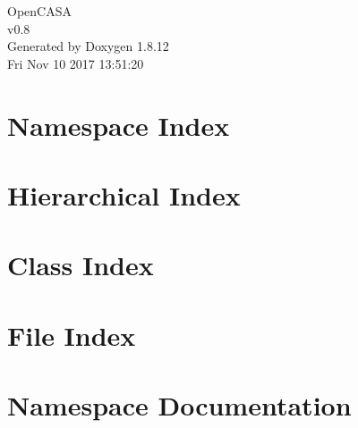 \documentclass[twoside]{book}
\newcommand{\+}{\discretionary{\mbox{\scriptsize$\hookleftarrow$}}{}{}}
\newcommand{\clearemptydoublepage}{%
  \newpage{\pagestyle{empty}\cleardoublepage}%
}
\begin{document}
\hypersetup{pageanchor=false,
             bookmarksnumbered=true,
             pdfencoding=unicode
            }
\begin{titlepage}
\vspace*{7cm}
\begin{center}%
{\Large Open\+C\+A\+SA \\[1ex]\large v0.\+8 }\\
\vspace*{1cm}
{\large Generated by Doxygen 1.8.12}\\
\vspace*{0.5cm}
{\small Fri Nov 10 2017 13:51:20}\\
\end{center}
\end{titlepage}
\clearemptydoublepage
{}
\tableofcontents
\clearemptydoublepage
{}
\hypersetup{pageanchor=true}

\chapter{Namespace Index}

\chapter{Hierarchical Index}

\chapter{Class Index}

\chapter{File Index}

\chapter{Namespace Documentation}




\end{document}
